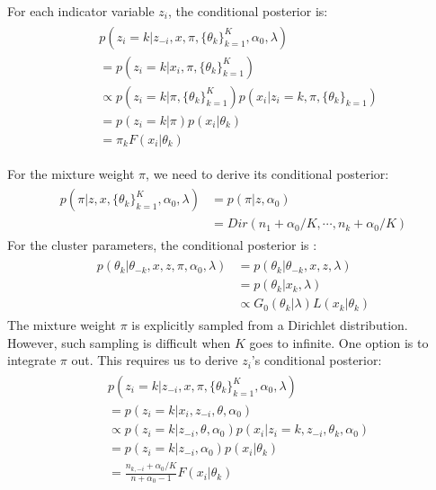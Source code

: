 \begin{itemize}
	 	For each indicator variable $z_i$, the conditional posterior is:
	 	\begin{eqnarray}
		 	\begin{split}
			 &	p(z_i=k|z_{-i},x,\pi,\{\theta_k\}_{k=1}^K,\alpha_0,\lambda)  \\
			 	 &= p(z_i=k|x_i,\pi,\{\theta_k\}_{k=1}^K) \\
			 	& \propto  p(z_i=k|\pi,\{\theta_k\}_{k=1}^K)p(x_i|z_i=k,\pi,\{\theta_k\}_{k=1})  \\
			 	 &=p(z_i=k|\pi)p(x_i|\theta_k) \\
			 	& =\pi_kF(x_i|\theta_k)
		 	\end{split}
	 	\end{eqnarray}

	 For the mixture weight $\pi$, we need to derive its conditional posterior:
	 \begin{eqnarray}
		 \begin{split}
			 p(\pi|z,x,\{\theta_k\}_{k=1}^K,\alpha_0,\lambda) &= p(\pi|z,\alpha_0)\\
			 	&=Dir(n_1+\alpha_0/K,\cdots,n_k+\alpha_0/K)
		 \end{split}
	 \end{eqnarray}
	 For the cluster parameters, the conditional posterior is :
	 \begin{eqnarray}
		 \begin{split}
			 p(\theta_k|\theta_{-k},x,z,\pi,\alpha_0,\lambda) &=p(\theta_k|\theta_{-k},x,z,\lambda)  \\
			 &= p(\theta_k|x_k,\lambda)\\
			 &\propto G_0(\theta_k|\lambda)L(x_k|\theta_k)
		 \end{split}
	 \end{eqnarray}
	 The mixture weight $\pi$ is explicitly sampled from a Dirichlet distribution. However, such sampling is difficult when $K$ goes to infinite. One option is to integrate $\pi$ out. This requires us to derive $z_i$’s conditional posterior:
	 \begin{eqnarray}
		 \begin{split}
			 &	p(z_i=k|z_{-i},x,\pi,\{\theta_k\}_{k=1}^K,\alpha_0,\lambda)  \\
			 &= p(z_i=k|x_i,z_{-i},\theta,\alpha_0) \\
			 & \propto  p(z_i=k|z_{-i},\theta,\alpha_0)p(x_i|z_i=k,z_{-i},\theta_k,\alpha_0)  \\
			 &=p(z_i=k|z_{-i},\alpha_0)p(x_i|\theta_k) \\
			 & =\frac{n_{k,-i}+\alpha_0/K}{n+\alpha_0-1}F(x_i|\theta_k)

\end{split}
\end{eqnarray}
\end{itemize}
